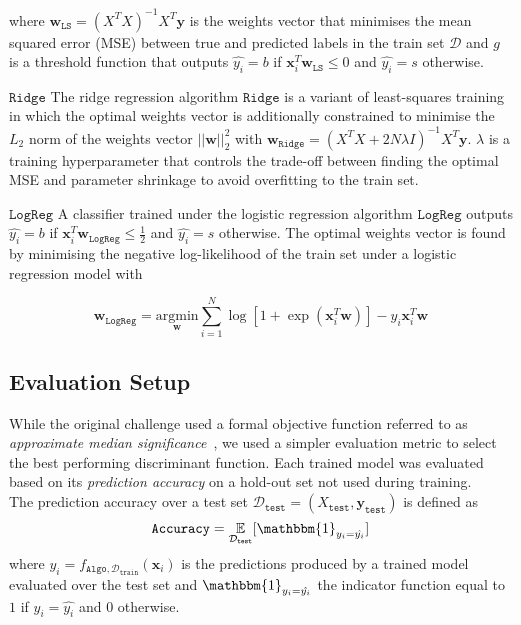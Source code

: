 \documentclass[10pt,conference,compsocconf]{IEEEtran}
\newcommand{\parabf}[1]{\vspace{1mm}\noindent\textbf{#1}}
\newcommand{\Data}{\mathcal{D}}
\newcommand{\Dtrain}{\mathcal{D}_{\mathtt{train}}}
\newcommand{\Dtest}{\mathcal{D}_{\mathtt{test}}}
\newcommand{\Xtest}{X_{\mathtt{test}}}
\newcommand{\ytest}{\mathbf{y}_{\mathtt{test}}}
\newcommand{\features}{\mathbf{x}_i}
\newcommand{\target}{y_i}
\newcommand{\targetvector}{\mathbf{y}}
\newcommand{\weights}{\mathbf{w}}
\newcommand{\classifier}[2]{f_{#1, #2}}
\newcommand{\Train}{\mathtt{Algo}}
\newcommand{\LeastSquares}{\mathtt{LS}}
\newcommand{\Ridge}{\mathtt{Ridge}}
\newcommand{\LogReg}{\mathtt{LogReg}}
\begin{document}
where $\weights_{\LeastSquares} = (X^T X)^{-1}X^T \targetvector$ is the weights vector that minimises the mean squared error (MSE) between true and predicted labels in the train set $\Data$ and $g$ is a threshold function that outputs $\hat{\target} = b$ if $\features^T \weights_{\LeastSquares} \leq 0$ and $\hat{\target} = s$ otherwise.

\parabf{$\Ridge$} The ridge regression algorithm $\Ridge$ is a variant of least-squares training in which the optimal weights vector is additionally constrained to minimise the $L_2$ norm of the weights vector $||\weights||_2^2$ with $\weights_\Ridge = (X^T X + 2N\lambda I)^{-1}X^T \targetvector$. $\lambda$ is a training hyperparameter that controls the trade-off between finding the optimal MSE and parameter shrinkage to avoid overfitting to the train set.

\parabf{$\LogReg$} A classifier trained under the logistic regression algorithm $\LogReg$ outputs $\hat{\target} = b$ if $\features^T \weights_{\LogReg} \leq \frac{1}{2}$ and $\hat{\target} = s$ otherwise. The optimal weights vector is found by minimising the negative log-likelihood of the train set under a logistic regression model with

\begin{equation}
	\weights_\LogReg = \underset{\weights}{\text{argmin}} \sum_{i=1}^{N} \log [ 1 + \exp(\features^T\weights) ] - \target\features^T\weights
\end{equation} 

\subsection{Evaluation Setup}
While the original challenge used a formal objective function referred to as \emph{approximate median significance}~\cite{HiggsML}, we used a simpler evaluation metric to select the best performing discriminant function. Each trained model was evaluated based on its \emph{prediction accuracy} on a hold-out set not used during training.\\
The prediction accuracy over a test set $\Dtest = (\Xtest, \ytest)$ is defined as
\begin{equation}
	\mathtt{Accuracy} = \underset{\Dtest}{\mathbb{E}}[ \mathbbm{1}_{\target = \hat{\target}} ]
\end{equation}
where $\hat{\target} = \classifier{\Train}{\Dtrain}(\features)$ is the predictions produced by a trained model evaluated over the test set and $\mathbbm{1}_{\target = \hat{\target}}$ the indicator function equal to $1$ if $\target = \hat{\target}$ and $0$ otherwise.
\end{document}
